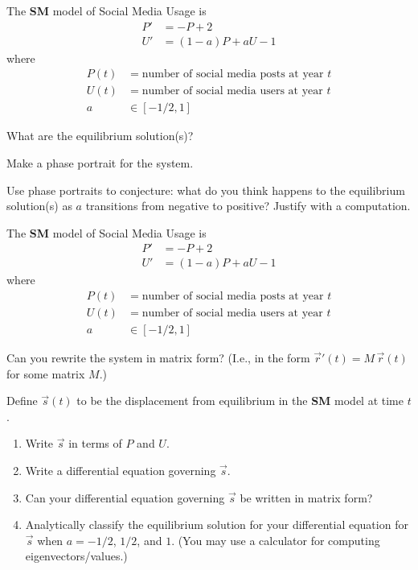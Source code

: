 \documentclass{workbook}
\begin{document}
\begin{slide}
	\question
	The \textbf{SM} model of Social Media Usage is
	\begin{align*}
		P'&=-P+2\\
		U'&=(1-a)P + aU - 1
	\end{align*}
	where
	\begin{align*}
		P(t) &= \text{number of social media posts at year $t$}\\
		U(t) &= \text{number of social media users at year $t$}\\
		a &\in [-1/2, 1]
	\end{align*}

	\begin{parts}
		\item What are the equilibrium solution(s)?
		\item Make a phase portrait for the system.
		\item Use phase portraits to conjecture: what do you think happens to the equilibrium
			solution(s) as $a$ transitions from negative to positive? Justify with a computation.
	\end{parts}
\end{slide}

\begin{slide}
	\question
	The \textbf{SM} model of Social Media Usage is
	\begin{align*}
		P'&=-P+2\\
		U'&=(1-a)P + aU - 1
	\end{align*}
	where
	\begin{align*}
		P(t) &= \text{number of social media posts at year $t$}\\
		U(t) &= \text{number of social media users at year $t$}\\
		a &\in [-1/2, 1]
	\end{align*}

	\begin{parts}
		\item Can you rewrite the system in matrix form? (I.e., in the form $\vec r'(t) = M\, \vec r(t)$ for some matrix $M$.)
		\item Define $\vec s(t)$  to be the displacement from equilibrium in the \textbf{SM} model at time $t$.
		\begin{enumerate}
			\item Write $\vec s$ in terms of $P$ and $U$.
			\item Write a differential equation governing $\vec s$.
			\item Can your differential equation governing $\vec s$ be written in matrix form?
			\item Analytically classify the equilibrium solution for your differential equation for $\vec s$
				when $a=-1/2$, $1/2$, and $1$. (You may use a calculator for computing eigenvectors/values.)
		\end{enumerate}
	\end{parts}
\end{slide}
\end{document}
